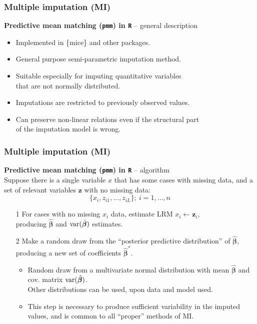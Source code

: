 \documentclass{beamer}
\begin{document}
\begin{frame}
\frametitle{Multiple imputation (MI)}
\textbf{Predictive mean matching (\texttt{pmm}) in \texttt{R}} -- general description\\
\bigskip
\begin{itemize}
    \item Implemented in \{mice\} and other packages.
    \medskip
    \item General purpose semi-parametric imputation method.
    \medskip
    \item Suitable especially for imputing quantitative variables \\that are not normally distributed.
    \medskip
    \item Imputations are restricted to previously observed values.
    \medskip
    \item Can preserve non-linear relations even if the structural part \\of the imputation model is wrong.
\end{itemize}
\end{frame}
\begin{frame}
\frametitle{Multiple imputation (MI)}
\textbf{Predictive mean matching (\texttt{pmm}) in \texttt{R}} -- algorithm\\
\medskip
Suppose there is a single variable $x$ that has some cases with missing data, and a set of relevant variables $\bm{z}$ with no missing data:
$$
\{ x_i, z_{i1}, \dots, z_{iL}\};~i = 1, \dots , n
$$
\vspace{-0.5cm}
\begin{enumerate}
    \item[1] For cases with no missing $x_i$ data, estimate LRM $x_i \leftarrow \bm{z}_i$, \\producing $\hat{\bm{\beta}}$ and $\textnormal{var}(\hat{\bm{\beta}})$ estimates.
    \medskip
    \item[2] Make a random draw from the ``posterior predictive distribution'' of $\hat{\bm{\beta}}$, producing a new set of coefficients $\hat{\bm{\beta}}^{\ast}$.\\
    \medskip
    \begin{itemize}
        \item Random draw from a multivariate normal distribution with mean $\hat{\bm{\beta}}$ and cov. matrix $\textnormal{var}(\hat{\bm{\beta}})$. \\ \smallskip Other distributions can be used, upon data and model used.
    \medskip 
    \item This step is necessary to produce sufficient variability in the imputed values, and is common to all ``proper'' methods of MI.
    \end{itemize}
\end{enumerate}
\end{frame}
\end{document}
